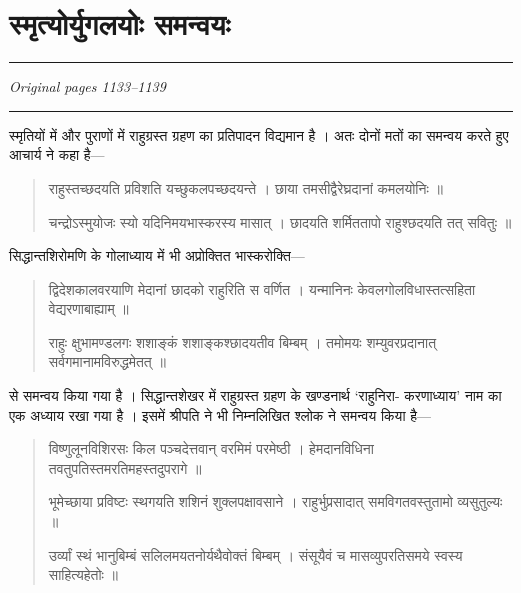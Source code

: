 \documentclass[11pt,a4paper]{article}
\newcommand{\dev}[1]{{\devanagarifont #1}}
\newenvironment{shloka}{\begin{quote}\devanagarifont}{\end{quote}}
\newenvironment{hindicom}{\devanagarifont}{\par}
\begin{document}
\section*{\dev{स्मृत्योर्युगलयोः समन्वयः}}

\noindent\rule{\textwidth}{0.6pt}
\begin{center}
\textit{Original pages 1133--1139}
\end{center}
\noindent\rule{\textwidth}{0.6pt}
\vspace{0.5cm}

\begin{hindicom}
\dev{स्मृतियों में और पुराणों में राहुग्रस्त ग्रहण का प्रतिपादन विद्यमान है । अतः दोनों मतों}
\dev{का समन्वय करते हुए आचार्य ने कहा है---}
\end{hindicom}

\begin{shloka}
\dev{राहुस्तच्छदयति प्रविशति यच्छुकलपच्छदयन्ते ।}
\dev{छाया तमसीद्वैरेघ्रदानां कमलयोनिः ॥}

\dev{चन्द्रोऽस्मुयोजः स्यो यदिनिमयभास्करस्य मासात् ।}
\dev{छादयति शर्मिततापो राहुश्छदयति तत् सवितुः ॥}
\end{shloka}

\begin{hindicom}
\dev{सिद्धान्तशिरोमणि के गोलाध्याय में भी अप्रोक्तित भास्करोक्ति---}
\end{hindicom}

\begin{shloka}
\dev{द्विदेशकालवरयाणि मेदानां छादको राहुरिति स वर्णित ।}
\dev{यन्मानिनः केवलगोलविधास्तत्सहिता वेद्यरणाबाह्याम् ॥}

\dev{राहुः क्षुभामण्डलगः शशाङ्कं शशाङ्कश्छादयतीव बिम्बम् ।}
\dev{तमोमयः शम्युवरप्रदानात् सर्वगमानामविरुद्धमेतत् ॥}
\end{shloka}

\begin{hindicom}
\dev{से समन्वय किया गया है । सिद्धान्तशेखर में राहुग्रस्त ग्रहण के खण्डनार्थ `राहुनिरा-}
\dev{करणाध्याय' नाम का एक अध्याय रखा गया है । इसमें श्रीपति ने भी निम्नलिखित}
\dev{श्लोक ने समन्वय किया है---}
\end{hindicom}

\begin{shloka}
\dev{विष्णुलूनविशिरसः किल पञ्चदेत्तवान् वरमिमं परमेष्ठी ।}
\dev{हेमदानविधिना तवतुपतिस्तमरतिमहस्तदुपरागे ॥}

\dev{भूमेच्छाया प्रविष्टः स्थगयति शशिनं शुक्लपक्षावसाने ।}
\dev{राहुर्भुप्रसादात् समविगतवस्तुतामो व्यसुतुल्यः ॥}

\dev{उर्व्यां स्थं भानुबिम्बं सलिलमयतनोर्यथैवोक्तं बिम्बम् ।}
\dev{संसूयैवं च मासव्युपरतिसमये स्वस्य साहित्यहेतोः ॥}
\end{shloka}
\end{document}
